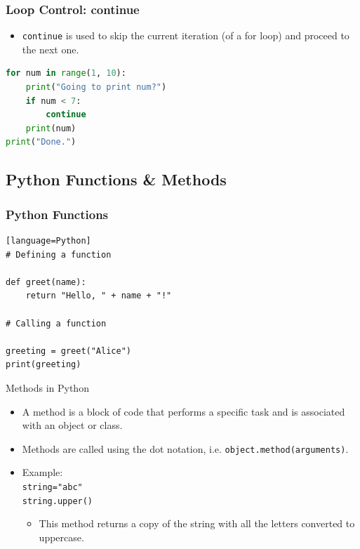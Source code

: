 \documentclass{beamer}
\begin{document}
    \begin{frame}[fragile]
        \frametitle{Loop Control: continue}
        \begin{itemize}
            \item \texttt{continue} is used to skip the current iteration (of a for loop) and proceed to the next one.
        \end{itemize}
        \begin{lstlisting}[language=Python]
for num in range(1, 10):
    print("Going to print num?")
    if num < 7:
        continue
    print(num)
print("Done.")
        \end{lstlisting}
    \end{frame}

    \subsection{Python Functions \& Methods}
    \begin{frame}[fragile]
        \frametitle{Python Functions}
        \begin{lstlisting}[caption=Python Functions][language=Python]
# Defining a function

def greet(name):
    return "Hello, " + name + "!"

# Calling a function

greeting = greet("Alice")
print(greeting)
        \end{lstlisting}
    \end{frame}

    \begin{frame}{Methods in Python}
        \begin{itemize}
            \item A method is a block of code that performs a specific task and is associated with an object or class.
            \item Methods are called using the dot notation, i.e. \texttt{object.method(arguments)}.
            \item Example: \\ \texttt{string="abc"} \\ \texttt{string.upper()}
        \begin{itemize}
            \item This method returns a copy of the string with all the letters converted to uppercase.
        \end{itemize}
        \end{itemize}
    \end{frame}
\end{document}
